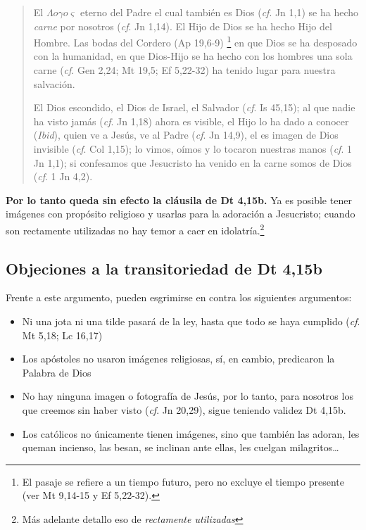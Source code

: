 \documentclass{article}
\begin{document}
\begin{quote}
El $\Lambda o \gamma o \varsigma$ eterno del Padre el cual tambi\'en es Dios (\emph{cf}. Jn 1,1) se ha hecho \emph{carne} por nosotros (\emph{cf}. Jn 1,14). El Hijo de Dios se ha hecho Hijo del Hombre. Las bodas del Cordero (Ap 19,6-9)%
    \footnote{El pasaje se refiere a un tiempo futuro, pero no excluye el tiempo presente (ver Mt 9,14-15 y Ef 5,22-32).}
en que Dios se ha desposado con la humanidad, en que Dios-Hijo se ha hecho con los hombres una sola carne (\emph{cf}. Gen 2,24; Mt 19,5; Ef 5,22-32) ha tenido lugar para nuestra salvaci\'on.

El Dios escondido, el Dios de Israel, el Salvador (\emph{cf}. Is 45,15); al que nadie ha visto jam\'as (\emph{cf}. Jn 1,18) ahora es visible, el Hijo lo ha dado a conocer (\emph{Ibid}), quien ve a Jes\'us, ve al Padre (\emph{cf}. Jn 14,9), el es imagen de Dios invisible (\emph{cf}. Col 1,15); lo vimos, o\'{i}mos y lo tocaron nuestras manos (\emph{cf}. 1 Jn 1,1); si confesamos que Jesucristo ha venido en la carne somos de Dios (\emph{cf}. 1 Jn 4,2).
\end{quote}

\noindent
\textbf{Por lo tanto queda sin efecto la cl\'ausila de Dt 4,15b.} Ya es posible tener im\'agenes con prop\'osito religioso y usarlas para la adoraci\'on a Jesucristo; cuando son rectamente utilizadas no hay temor a caer en idolatr\'{i}a.\footnote{M\'as adelante detallo eso de \emph{rectamente utilizadas}} %

\subsection{Objeciones a la transitoriedad de Dt 4,15b}

Frente a este argumento, pueden esgrimirse en contra los siguientes argumentos:

\begin{itemize}
\item Ni una jota ni una tilde pasará de la ley, hasta que todo se haya cumplido (\emph{cf}. Mt 5,18; Lc 16,17)
\item Los ap\'ostoles no usaron im\'agenes religiosas, s\'{i}, en cambio, predicaron la Palabra de Dios
\item No hay ninguna imagen o fotograf\'{i}a de Jes\'us, por lo tanto, para nosotros los que creemos sin haber visto (\emph{cf}. Jn 20,29), sigue teniendo validez Dt 4,15b.
\item Los cat\'olicos no \'unicamente tienen im\'agenes, sino que tambi\'en las adoran, les queman incienso, las besan, se inclinan ante ellas, les cuelgan milagritos\ldots
\end{itemize}
\end{document}
